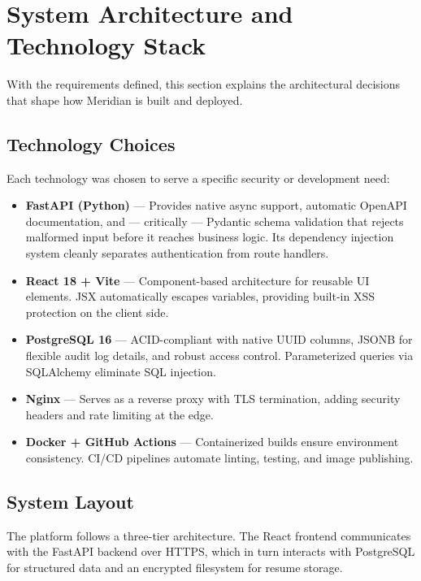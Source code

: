 
\section{System Architecture and Technology Stack}
\label{sec:architecture}

With the requirements defined, this section explains the architectural decisions that shape how Meridian is built and deployed.

\subsection{Technology Choices}

Each technology was chosen to serve a specific security or development need:

\begin{itemize}
    \item \textbf{FastAPI (Python)} — Provides native async support, automatic OpenAPI documentation, and — critically — Pydantic schema validation that rejects malformed input before it reaches business logic. Its dependency injection system cleanly separates authentication from route handlers.
    \item \textbf{React 18 + Vite} — Component-based architecture for reusable UI elements. JSX automatically escapes variables, providing built-in XSS protection on the client side.
    \item \textbf{PostgreSQL 16} — ACID-compliant with native UUID columns, JSONB for flexible audit log details, and robust access control. Parameterized queries via SQLAlchemy eliminate SQL injection.
    \item \textbf{Nginx} — Serves as a reverse proxy with TLS termination, adding security headers and rate limiting at the edge.
    \item \textbf{Docker + GitHub Actions} — Containerized builds ensure environment consistency. CI/CD pipelines automate linting, testing, and image publishing.
\end{itemize}

\subsection{System Layout}

The platform follows a three-tier architecture. The React frontend communicates with the FastAPI backend over HTTPS, which in turn interacts with PostgreSQL for structured data and an encrypted filesystem for resume storage.

